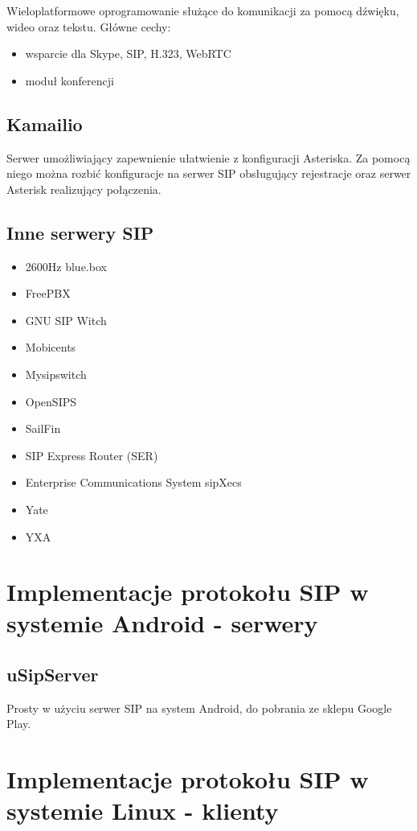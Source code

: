 Wieloplatformowe oprogramowanie służące do komunikacji za pomocą dźwięku, wideo oraz tekstu. 
Główne cechy:
\begin{itemize}
	\item wsparcie dla Skype, SIP, H.323, WebRTC
	\item moduł konferencji 
\end{itemize}

\subsection{Kamailio}

Serwer umożliwiający zapewnienie ułatwienie z konfiguracji Asteriska. Za pomocą niego można rozbić konfiguracje na serwer SIP obsługujący rejestracje oraz serwer Asterisk realizujący połączenia. 

\subsection{Inne serwery SIP}
 
\begin{itemize}
	\item 2600Hz blue.box
	\item FreePBX
	\item GNU SIP Witch
	\item Mobicents 
	\item Mysipswitch
	\item OpenSIPS
	\item SailFin
	\item SIP Express Router (SER)
	\item Enterprise Communications System sipXecs
	\item Yate
	\item YXA
\end{itemize}

\section{Implementacje protokołu SIP w systemie Android - serwery}

\subsection{uSipServer}

Prosty w użyciu serwer SIP na system Android, do pobrania ze sklepu Google Play.
 
\section{Implementacje protokołu SIP w systemie Linux - klienty}

